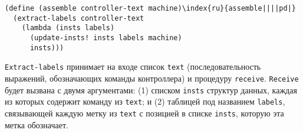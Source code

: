 \begin{Verbatim}[fontsize=\small]
(define (assemble controller-text machine)\index{ru}{assemble||||pd|}
  (extract-labels controller-text
    (lambda (insts labels)
      (update-insts! insts labels machine)
      insts)))
\end{Verbatim}

{\tt Extract-labels} принимает на входе список
{\tt text} (последовательность выражений, обозначающих команды
контроллера) и процедуру  {\tt receive}. 
{\tt Re\-ceive} будет вызвана с двумя аргументами: (1) списком {\tt insts}
структур данных, каждая из которых содержит команду из
{\tt text}; и (2) таблицей под названием {\tt labels},
связывающей каждую метку из {\tt text} с позицией в
списке {\tt insts}, которую эта метка обозначает.

